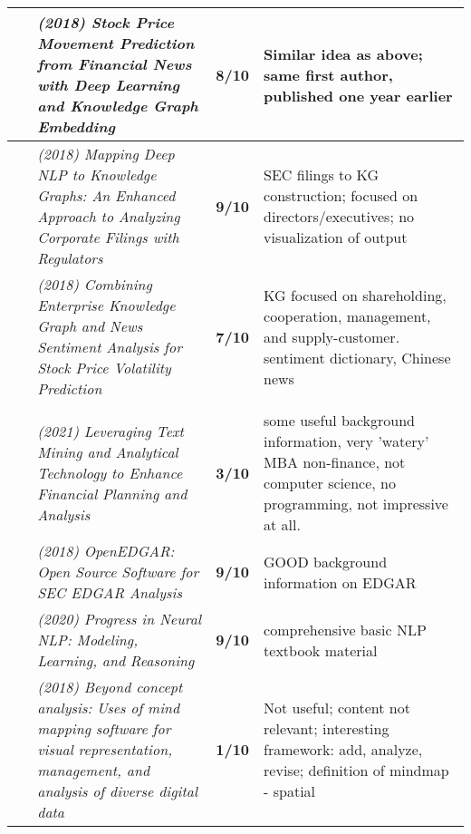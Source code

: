 \documentclass[10pt]{article}
\begin{document}
\begin{landscape}
\begin{longtable}{ |m{2em}|m{28em}|m{3em}|m{24em}| }
~\cite{2018_KG_finNews_price} & \emph{(2018) Stock Price Movement Prediction from Financial News with Deep Learning and Knowledge Graph Embedding}
& \textbf{8/10} & Similar idea as above; same first author, published one year earlier\\
 \hline 

~\cite{2018_KG_directors} & \emph{(2018) Mapping Deep NLP to Knowledge Graphs: An Enhanced Approach to Analyzing Corporate Filings with Regulators}
& \textbf{9/10} & SEC filings to KG construction; focused on directors/executives; no visualization of output\\
 \hline 

~\cite{2018_KG_sentimentPrice} & \emph{(2018) Combining Enterprise Knowledge Graph and News Sentiment Analysis for Stock Price Volatility Prediction}
& \textbf{7/10} & KG focused on shareholding, cooperation, management, and supply-customer. sentiment dictionary, Chinese news \\
 \hline 


\rowcolor{lightgray}\multicolumn{4}{|l|}{Background} \\
 \hline 

~\cite{2021_MBAbla} & \emph{(2021) Leveraging Text Mining and Analytical Technology to Enhance Financial Planning and Analysis}
& \textbf{3/10} & some useful background information, very 'watery' MBA non-finance, not computer science, no programming, not impressive at all.\\
 \hline 



~\cite{2018_openedgar} & \emph{(2018) OpenEDGAR: Open Source Software for SEC EDGAR Analysis}
& \textbf{9/10} & GOOD background information on EDGAR\\
 \hline 

~\cite{2020_basicNLP} & \emph{(2020) Progress in Neural NLP: Modeling, Learning, and Reasoning}
& \textbf{9/10} & comprehensive basic NLP textbook material\\
 \hline 

~\cite{2018_mindmap} & \emph{(2018) Beyond concept analysis: Uses of mind mapping software for visual representation, management, and analysis of diverse digital data}
& \textbf{1/10} & Not useful; content not relevant; interesting framework: add, analyze, revise; definition of mindmap - spatial\\
 \hline 


\end{longtable}
\end{landscape}
\end{document}
